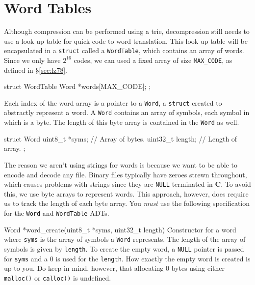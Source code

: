 \section{Word Tables}\label{sec:wordtable}

Although compression can be performed using a trie, decompression still needs to
use a look-up table for quick code-to-word translation. This look-up table will
be encapsulated in a \texttt{struct} called a \texttt{WordTable}, which contains
an array of words. Since we only have $2^{16}$ codes, we can used a fixed array
of size \texttt{MAX\_CODE}, as defined in \S\ref{sec:lz78}.

\begin{clisting}{}
struct WordTable {
    Word *words[MAX_CODE];
};

\end{clisting}

Each index of the word array is a pointer to a \texttt{Word}, a \texttt{struct}
created to abstractly represent a word. A \texttt{Word} contains an array of
symbols, each symbol in which is a byte. The length of this byte array is
contained in the \texttt{Word} as well.

\begin{clisting}{}
struct Word {
    uint8_t *syms;   // Array of bytes.
    uint32_t length; // Length of array.
};
\end{clisting}

The reason we aren't using strings for words is because we want to be able to
encode and decode any file. Binary files typically have zeroes strewn
throughout, which causes problems with strings since they are
\texttt{NULL}-terminated in \textbf{C}. To avoid this, we use byte arrays to
represent words. This approach, however, does require us to track the length of
each byte array. You \emph{must} use the following specification for the
\texttt{Word} and \texttt{WordTable} ADTs.

\begin{funcdoc}{Word *word\_create(uint8\_t *syms, uint32\_t length)}
  Constructor for a word where \texttt{syms} is the array of symbols a
  \texttt{Word} represents. The length of the array of symbols is given by
  \texttt{length}. To create the empty word, a \texttt{NULL} pointer is passed
  for \texttt{syms} and a 0 is used for the \texttt{length}. How exactly the
  empty word is created is up to you. Do keep in mind, however, that allocating
  0 bytes using either \texttt{malloc()} or \texttt{calloc()} is undefined.
\end{funcdoc}

